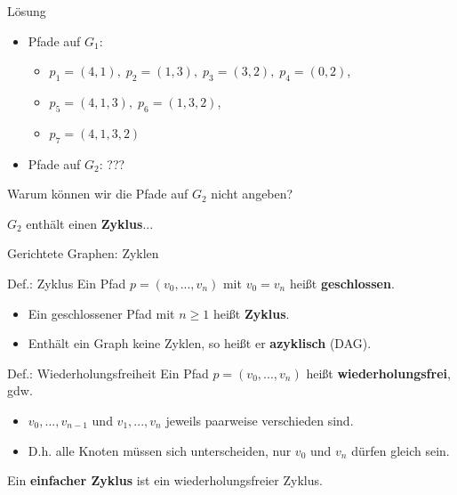 \begin{frame}
	\begin{block}{Lösung}
	\begin{itemize}
		\item Pfade auf $G_1$: \begin{itemize}
			\item $p_1=(4,1), \; p_2=(1,3), \; p_3=(3,2), \; p_4=(0,2)$,
			\item $p_5=(4,1,3), \; p_6=(1,3,2)$,
			\item $p_7=(4,1,3,2)$
			\end{itemize}
		\item Pfade auf $G_2$: ???
	\end{itemize}
	\end{block}
		
	Warum können wir die Pfade auf $G_2$ nicht angeben?\newline
	\pause

	$G_2$ enthält einen \textbf{Zyklus}...

\end{frame}

\begin{frame}{Gerichtete Graphen: Zyklen}
	\begin{block}{Def.: Zyklus}
		Ein Pfad $p=(v_0,...,v_n)$ mit $v_0=v_n$ heißt \textbf{geschlossen}.
		\begin{itemize}
			\item Ein geschlossener Pfad mit $n \ge 1$ heißt \textbf{Zyklus}.
			\item Enthält ein Graph keine Zyklen, so heißt er \textbf{azyklisch} (DAG).
		\end{itemize}		
	\end{block}
	\pause
	\begin{block}{Def.: Wiederholungsfreiheit}
		Ein Pfad $p=(v_0,...,v_n)$ heißt \textbf{wiederholungsfrei}, gdw. 
		\begin{itemize}
			\item $v_0,...,v_{n-1}$ und $v_1,...,v_n$ jeweils paarweise verschieden sind.
			\item D.h. alle Knoten müssen sich unterscheiden, nur $v_0$ und $v_n$ dürfen gleich sein.
		\end{itemize}
		\medskip
		Ein \textbf{einfacher Zyklus} ist ein wiederholungsfreier Zyklus.
	\end{block}
	
\end{frame}
		
